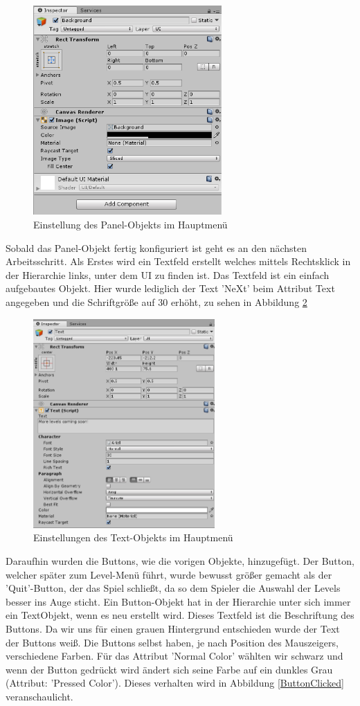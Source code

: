 \begin{figure}[H]
	\centering
	\includegraphics[height=8cm]{images/PanelSetup.png}
	\caption{Einstellung des Panel-Objekts im Hauptmenü}
	\label{PanelSetup}
\end{figure}
Sobald das Panel-Objekt fertig konfiguriert ist geht es an den nächsten Arbeitsschritt. Als Erstes wird ein Textfeld erstellt welches mittels Rechtsklick in der Hierarchie links, unter dem UI zu finden ist.
Das Textfeld ist ein einfach aufgebautes Objekt. Hier wurde lediglich der Text ’NeXt’ beim Attribut Text angegeben und die Schriftgröße auf 30 erhöht, zu sehen in Abbildung  \ref{TextSetupMainMenu}
\begin{figure}[H]
	\centering
	\includegraphics[height=8cm]{images/MainMenuTextSetup.png}
	\caption{Einstellungen des Text-Objekts im Hauptmenü}
	\label{TextSetupMainMenu}
\end{figure}
 Daraufhin wurden die Buttons, wie die vorigen Objekte, hinzugefügt. Der Button, welcher später zum Level-Menü führt, wurde bewusst größer gemacht als der ’Quit’-Button, der das Spiel schließt, da so dem Spieler die Auswahl der Levels besser ins Auge sticht. Ein Button-Objekt hat in der Hierarchie unter sich immer ein TextObjekt, wenn es neu erstellt wird. Dieses Textfeld ist die Beschriftung des Buttons. Da wir uns für einen grauen Hintergrund entschieden wurde der Text der Buttons weiß. Die Buttons selbst haben, je nach Position des Mauszeigers, verschiedene Farben. Für das Attribut ’Normal Color’ wählten wir schwarz und wenn der Button gedrückt wird ändert sich seine Farbe auf ein dunkles Grau (Attribut: ’Pressed Color’). Dieses verhalten wird in Abbildung \ref{ButtonClicked} veranschaulicht.
 
